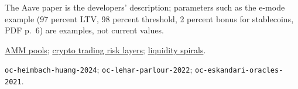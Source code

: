 \begin{qfmechanism}
 The Aave paper is the developers' description; parameters such as the e-mode example (97 percent LTV, 98 percent threshold, 2 percent bonus for stablecoins, PDF p.~6) are examples, not current values.

 \hyperref[def:amm-pool-mechanics]{AMM pools}; \hyperref[def:crypto-trading-risk-layers]{crypto trading risk layers}; \hyperref[mod:liquidity-spirals]{liquidity spirals}.

 \nolinkurl{oc-heimbach-huang-2024}; \nolinkurl{oc-lehar-parlour-2022}; \nolinkurl{oc-eskandari-oracles-2021}.

\end{qfmechanism}
